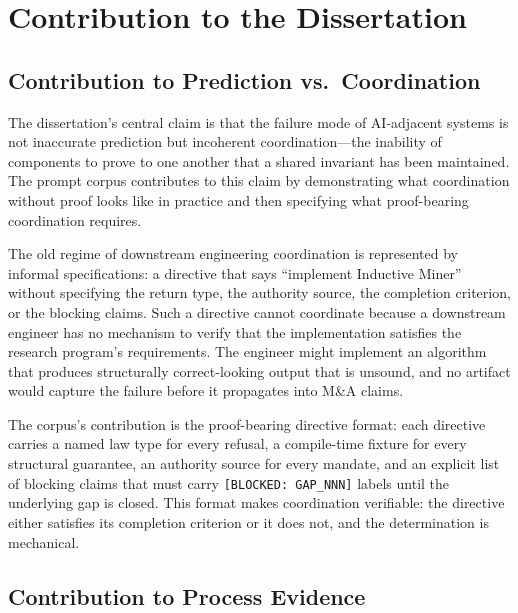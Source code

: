 
\section{Contribution to the Dissertation}
\label{sec:prompts-contribution}

\subsection{Contribution to Prediction vs.~Coordination}
\label{sec:prompts-contribution-prediction}

The dissertation's central claim is that the failure mode of AI-adjacent systems is
not inaccurate prediction but incoherent coordination---the inability of components to
prove to one another that a shared invariant has been maintained. The prompt corpus
contributes to this claim by demonstrating what coordination without proof looks like
in practice and then specifying what proof-bearing coordination requires.

The old regime of downstream engineering coordination is represented by informal
specifications: a directive that says ``implement Inductive Miner'' without specifying
the return type, the authority source, the completion criterion, or the blocking
claims. Such a directive cannot coordinate because a downstream engineer has no
mechanism to verify that the implementation satisfies the research program's
requirements. The engineer might implement an algorithm that produces structurally
correct-looking output that is unsound, and no artifact would capture the failure
before it propagates into M\&A claims.

The corpus's contribution is the proof-bearing directive format: each directive
carries a named law type for every refusal, a compile-time fixture for every
structural guarantee, an authority source for every mandate, and an explicit list of
blocking claims that must carry \texttt{[BLOCKED: GAP\_NNN]} labels until the
underlying gap is closed. This format makes coordination verifiable: the directive
either satisfies its completion criterion or it does not, and the determination is
mechanical.

\subsection{Contribution to Process Evidence}
\label{sec:prompts-contribution-evidence}

